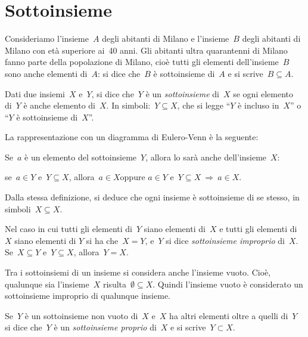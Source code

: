 \ovalbox{\risolvii \ref{ese:5.33}, \ref{ese:5.34}, \ref{ese:5.35}, \ref{ese:5.36}, \ref{ese:5.37}, \ref{ese:5.38}, \ref{ese:5.39}, \ref{ese:5.40}}

\section{Sottoinsieme}

Consideriamo l'insieme~$A$ degli abitanti di Milano e l'insieme~$B$ degli abitanti di Milano
con età superiore ai~40 anni. Gli abitanti ultra quarantenni di Milano fanno parte della popolazione di Milano, cioè tutti gli
elementi dell'insieme~$B$ sono anche elementi di~$A$: si dice che~$B$ è sottoinsieme di~$A$ e si scrive~$B\subseteq A$.

\begin{definizione}
Dati due insiemi~$X$ e~$Y$, si dice che~$Y$ è un \emph{sottoinsieme} di~$X$
se ogni elemento di~$Y$ è anche elemento di~$X$.
In simboli:~$Y\subseteq X$, che si legge
``$Y$ è incluso in~$X$'' o ``$Y$ è sottoinsieme di~$X$''.
\end{definizione}

La rappresentazione con un diagramma di Eulero-Venn è la seguente:
\begin{center}

\end{center}
Se~$a$ è un elemento del sottoinsieme~$Y$, allora lo sarà anche dell'insieme~$X$:
\begin{center}
se~$a\in Y$ e~$Y\subseteq X$, allora~$a\in X$\qquad oppure \qquad $a\in Y$ e~$Y\subseteq X \:\Rightarrow\:a\in X$.
\end{center}

Dalla stessa definizione, si deduce che ogni insieme è sottoinsieme di
se stesso, in simboli~$X\subseteq X$.

Nel caso in cui tutti gli elementi di~$Y$ siano elementi di~$X$ e tutti gli elementi di~$X$ siano elementi di
$Y$ si ha che~$X=Y$, e~$Y$ si dice \emph{sottoinsieme improprio} di~$X$.
Se~$X\subseteq Y$ e~$Y\subseteq X$, allora~$Y=X$.

Tra i sottoinsiemi di un insieme si considera anche
l'insieme vuoto. Cioè, qualunque sia
l'insieme~$X$ risulta~$\emptyset \subseteq X$.
Quindi l'insieme vuoto è considerato un sottoinsieme improprio di qualunque insieme.

Se~$Y$ è un sottoinsieme non vuoto di~$X$ e~$X$ ha altri elementi oltre a quelli di~$Y$
si dice che~$Y$ è un \emph{sottoinsieme proprio} di~$X$ e si scrive~$Y\subset X$.

